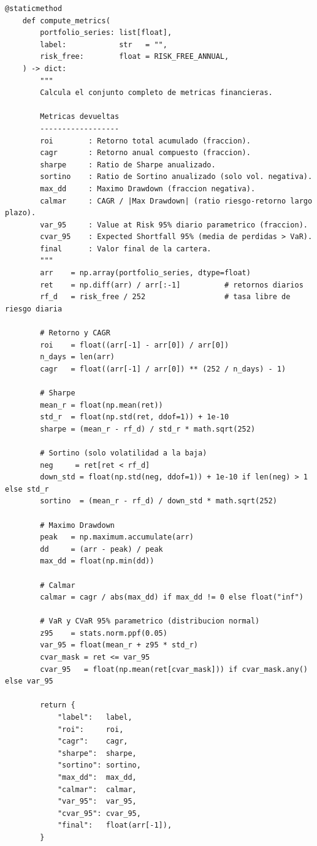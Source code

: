 \documentclass[12pt, a4paper]{article}
\begin{document}
\begin{lstlisting}[caption={Metodo \texttt{compute\_metrics()} -- métricas extendidas de riesgo}]
    @staticmethod
    def compute_metrics(
        portfolio_series: list[float],
        label:            str   = "",
        risk_free:        float = RISK_FREE_ANNUAL,
    ) -> dict:
        """
        Calcula el conjunto completo de metricas financieras.

        Metricas devueltas
        ------------------
        roi        : Retorno total acumulado (fraccion).
        cagr       : Retorno anual compuesto (fraccion).
        sharpe     : Ratio de Sharpe anualizado.
        sortino    : Ratio de Sortino anualizado (solo vol. negativa).
        max_dd     : Maximo Drawdown (fraccion negativa).
        calmar     : CAGR / |Max Drawdown| (ratio riesgo-retorno largo plazo).
        var_95     : Value at Risk 95% diario parametrico (fraccion).
        cvar_95    : Expected Shortfall 95% (media de perdidas > VaR).
        final      : Valor final de la cartera.
        """
        arr    = np.array(portfolio_series, dtype=float)
        ret    = np.diff(arr) / arr[:-1]          # retornos diarios
        rf_d   = risk_free / 252                  # tasa libre de riesgo diaria

        # Retorno y CAGR
        roi    = float((arr[-1] - arr[0]) / arr[0])
        n_days = len(arr)
        cagr   = float((arr[-1] / arr[0]) ** (252 / n_days) - 1)

        # Sharpe
        mean_r = float(np.mean(ret))
        std_r  = float(np.std(ret, ddof=1)) + 1e-10
        sharpe = (mean_r - rf_d) / std_r * math.sqrt(252)

        # Sortino (solo volatilidad a la baja)
        neg     = ret[ret < rf_d]
        down_std = float(np.std(neg, ddof=1)) + 1e-10 if len(neg) > 1 else std_r
        sortino  = (mean_r - rf_d) / down_std * math.sqrt(252)

        # Maximo Drawdown
        peak   = np.maximum.accumulate(arr)
        dd     = (arr - peak) / peak
        max_dd = float(np.min(dd))

        # Calmar
        calmar = cagr / abs(max_dd) if max_dd != 0 else float("inf")

        # VaR y CVaR 95% parametrico (distribucion normal)
        z95    = stats.norm.ppf(0.05)
        var_95 = float(mean_r + z95 * std_r)
        cvar_mask = ret <= var_95
        cvar_95   = float(np.mean(ret[cvar_mask])) if cvar_mask.any() else var_95

        return {
            "label":   label,
            "roi":     roi,
            "cagr":    cagr,
            "sharpe":  sharpe,
            "sortino": sortino,
            "max_dd":  max_dd,
            "calmar":  calmar,
            "var_95":  var_95,
            "cvar_95": cvar_95,
            "final":   float(arr[-1]),
        }
\end{lstlisting}
\end{document}
